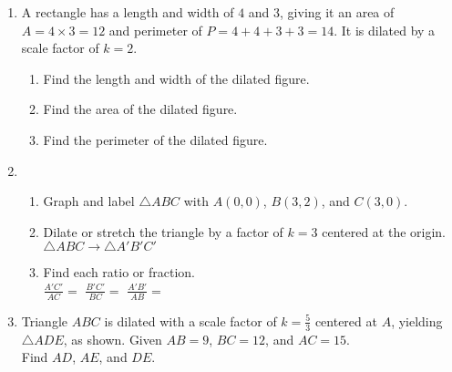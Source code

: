 \documentclass[12pt, twoside]{article}
\begin{document}
\begin{enumerate}
\item A rectangle has a length and width of $4$ and $3$, giving it an area of $A=4 \times 3 = 12$ and perimeter of $P=4+4+3+3=14$. It is dilated by a scale factor of $k=2$.
  \begin{enumerate}[itemsep=1cm]
    \item Find the length and width of the dilated figure.
    \item Find the area of the dilated figure.
    \item Find the perimeter of the dilated figure.
  \end{enumerate}

\newpage
\item \begin{enumerate}
  \item Graph and label $\triangle ABC$ with $A(0,0)$, $B(3,2)$, and $C(3,0)$.
  \begin{center}
  \end{center}
  \item Dilate or stretch the triangle by a factor of $k=3$ centered at the origin.\\ $\triangle ABC \rightarrow \triangle A'B'C'$
  \item Find each ratio or fraction. \\[0.5cm]
    $\displaystyle \frac{A'C'}{AC}=$ \hfill
    $\displaystyle \frac{B'C'}{BC}=$ \hfill
    $\displaystyle \frac{A'B'}{AB}=$ \hspace{2cm}
\vspace{1cm}
\end{enumerate}

\item Triangle $ABC$ is dilated with a scale factor of $k=\frac{5}{3}$ centered at $A$, yielding $\triangle ADE$, as shown. Given $AB=9$, $BC=12$, and $AC=15$. \\[0.25cm] Find $AD$, $AE$, and $DE$. \vspace{0.5cm}
  \begin{center}
  \end{center}


\end{enumerate}
\end{document}
